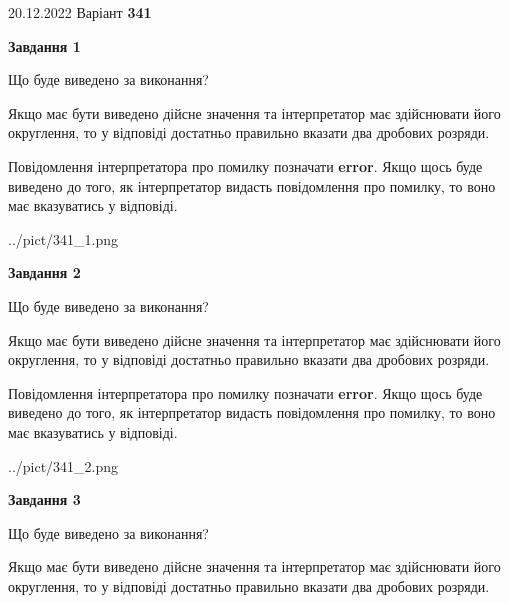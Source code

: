 \documentclass[12pt, ukrainian]{article}
\begin{document}
{20.12.2022 Варіант \No \textbf { 341 }\par}
{
\begin {Large}

{\begin {center}\textbf{Завдання 1}\end {center}}\par
Що буде виведено за виконання? \par

Якщо має бути виведено дійсне значення та інтерпретатор має здійснювати його округлення, 
то у відповіді достатньо правильно вказати два дробових розряди.

Повідомлення інтерпретатора про помилку позначати \textbf{error}.
Якщо щось буде виведено до того, як інтерпретатор видасть повідомлення про помилку, 
то воно має вказуватись у відповіді. \par

\begin{center}
	{../pict/341_1.png}
\end{center}
\newpage

{\begin {center}\textbf{Завдання 2}\end {center}}\par
Що буде виведено за виконання? \par

Якщо має бути виведено дійсне значення та інтерпретатор має здійснювати його округлення, 
то у відповіді достатньо правильно вказати два дробових розряди.

Повідомлення інтерпретатора про помилку позначати \textbf{error}.
Якщо щось буде виведено до того, як інтерпретатор видасть повідомлення про помилку, 
то воно має вказуватись у відповіді. \par

\begin{center}
	{../pict/341_2.png}
\end{center}
\newpage

{\begin {center}\textbf{Завдання 3}\end {center}}\par
Що буде виведено за виконання? \par

Якщо має бути виведено дійсне значення та інтерпретатор має здійснювати його округлення, 
то у відповіді достатньо правильно вказати два дробових розряди.


\end{Large}}
\end{document}
